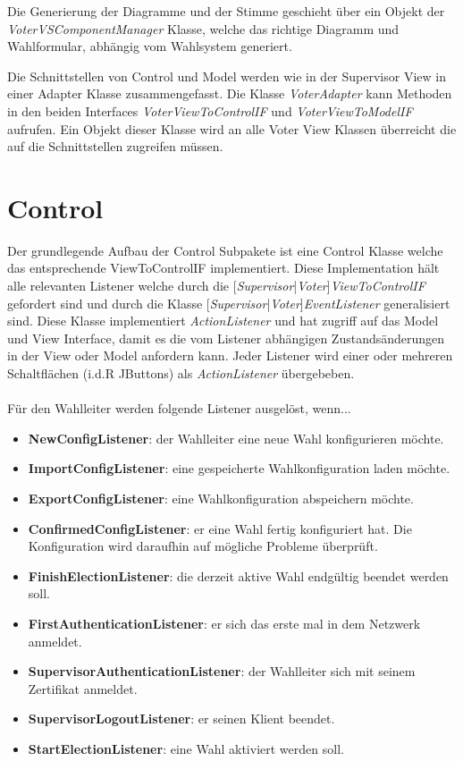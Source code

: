 \documentclass[parskip=full]{scrartcl}
\newcommand{\fakeparagraph}[1]{\textbf{#1}}
\begin{document}
		Die Generierung der Diagramme und der Stimme geschieht über ein Objekt der \textit{VoterVSComponentManager} Klasse, welche das richtige Diagramm und Wahlformular, abhängig vom Wahlsystem generiert.
		
		Die Schnittstellen von Control und Model werden wie in der Supervisor View in einer Adapter Klasse zusammengefasst. Die Klasse \textit{VoterAdapter} kann Methoden in den beiden Interfaces \textit{VoterViewToControlIF} und \textit{VoterViewToModelIF} aufrufen. Ein Objekt dieser Klasse wird an alle Voter View Klassen überreicht die auf die Schnittstellen zugreifen müssen.
	\newpage

	\section{Control}
	Der grundlegende Aufbau der Control Subpakete ist eine Control Klasse welche das entsprechende ViewToControlIF implementiert. Diese Implementation hält alle relevanten Listener welche durch die [\textit{Supervisor}|\textit{Voter}]\textit{ViewToControlIF} gefordert sind und durch die Klasse [\textit{Supervisor}|\textit{Voter}]\textit{EventListener} generalisiert sind. Diese Klasse implementiert \textit{ActionListener} und hat zugriff auf das Model und View Interface, damit es die vom Listener abhängigen Zustandsänderungen in der View oder Model anfordern kann. Jeder Listener wird einer oder mehreren Schaltflächen (i.d.R JButtons) als \textit{ActionListener} übergebeben.\\
	\\
	Für den Wahlleiter werden folgende Listener ausgelöst, wenn...
	\begin{itemize}
		\item\fakeparagraph{NewConfigListener}: der Wahlleiter eine neue Wahl konfigurieren möchte.
		\item\fakeparagraph{ImportConfigListener}: eine gespeicherte Wahlkonfiguration laden möchte.
		\item\fakeparagraph{ExportConfigListener}: eine Wahlkonfiguration abspeichern möchte.
		\item\fakeparagraph{ConfirmedConfigListener}: er eine Wahl fertig konfiguriert hat. Die Konfiguration wird daraufhin auf mögliche Probleme überprüft.
		\item\fakeparagraph{FinishElectionListener}: die derzeit aktive Wahl endgültig beendet werden soll. 
		\item\fakeparagraph{FirstAuthenticationListener}: er sich das erste mal in dem Netzwerk anmeldet.
		\item\fakeparagraph{SupervisorAuthenticationListener}: der Wahlleiter sich mit seinem Zertifikat anmeldet.
		\item\fakeparagraph{SupervisorLogoutListener}: er seinen Klient beendet.
		\item\fakeparagraph{StartElectionListener}: eine Wahl aktiviert werden soll.
	\end{itemize}
	
\end{document}
